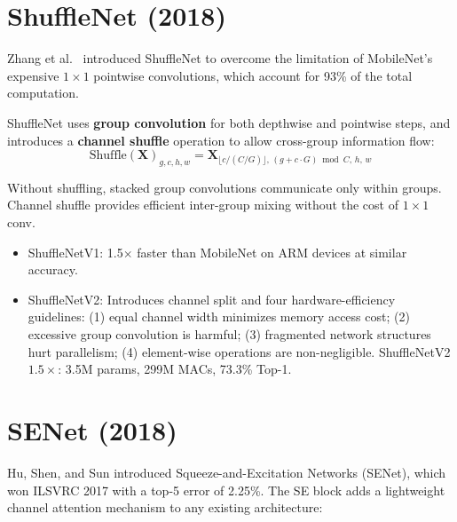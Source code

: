 \section{ShuffleNet (2018)}

Zhang et al.\ \cite{zhang2018shufflenet} introduced ShuffleNet to overcome the limitation of MobileNet's expensive $1\times1$ pointwise convolutions, which account for 93\% of the total computation.

ShuffleNet uses \textbf{group convolution} for both depthwise and pointwise steps, and introduces a \textbf{channel shuffle} operation to allow cross-group information flow:
\begin{equation}
\text{Shuffle}(\mathbf{X})_{g,c,h,w} = \mathbf{X}_{\lfloor c/(C/G)\rfloor,\, (g + c \cdot G) \bmod C,\, h,\, w}
\end{equation}

Without shuffling, stacked group convolutions communicate only within groups. Channel shuffle provides efficient inter-group mixing without the cost of $1\times1$ conv.

\begin{properties}
\begin{itemize}
    \item ShuffleNetV1: 1.5$\times$ faster than MobileNet on ARM devices at similar accuracy.
    \item ShuffleNetV2: Introduces channel split and four hardware-efficiency guidelines: (1) equal channel width minimizes memory access cost; (2) excessive group convolution is harmful; (3) fragmented network structures hurt parallelism; (4) element-wise operations are non-negligible. ShuffleNetV2 $1.5\times$: 3.5M params, 299M MACs, 73.3\% Top-1.
\end{itemize}
\end{properties}

\section{SENet (2018)}

Hu, Shen, and Sun \cite{hu2018squeeze} introduced Squeeze-and-Excitation Networks (SENet), which won ILSVRC 2017 with a top-5 error of 2.25\%. The SE block adds a lightweight channel attention mechanism to any existing architecture:

